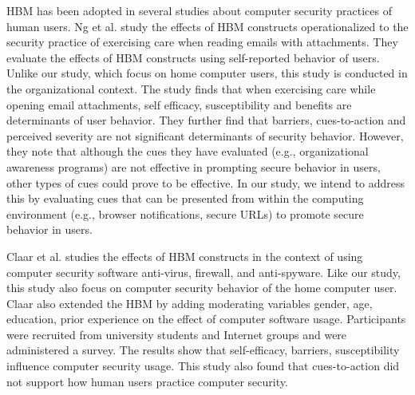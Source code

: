 HBM has been adopted in several studies about computer security practices of human users. Ng et al. \citeyear{ng2007} study the effects of HBM constructs operationalized to the security practice of exercising care when reading emails with attachments. They evaluate the effects of HBM constructs using self-reported behavior of users. Unlike our study, which focus on home computer users, this study is conducted in the organizational context. The study finds that when exercising care while opening email attachments, self efficacy, susceptibility and benefits are determinants of user behavior. They further find that barriers, cues-to-action and perceived severity are not significant determinants of security behavior. However, they note that although the cues they have evaluated (e.g., organizational awareness programs) are not effective in prompting secure behavior in users, other types of cues could prove to be effective. In our study, we intend to address this by evaluating cues that can be presented from within the computing environment (e.g., browser notifications, secure URLs) to promote secure behavior in users.

Claar et al. \citeyear{claar2010} studies the effects of HBM constructs in the context of using computer security software anti-virus, firewall, and  anti-spyware. Like our study, this study also focus on computer security behavior of the home computer user. Claar also extended the HBM by adding moderating variables gender, age, education, prior experience on the effect of computer software usage. Participants were recruited from university students and Internet groups and were administered a survey. The results show that self-efficacy, barriers, susceptibility influence computer security usage. This study also found that cues-to-action did not support how human users practice computer security.

